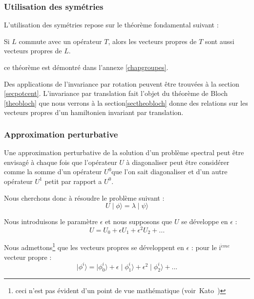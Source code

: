 \documentclass[12pt]{book}
\begin{document}
\subsubsection{Utilisation des sym\'etries}
L'utilisation des sym\'etries repose sur le th\'eor\`eme fondamental suivant :
\begin{thm}
Si $L$ commute avec un op\'erateur $T$, alors les vecteurs propres de $T$ sont
aussi vecteurs propres de $L$. 
\end{thm}
ce th\'eor\`eme est d\'emontr\'e dans l'annexe \ref{chapgroupes}.

Des applications de l'invariance par rotation peuvent \^etre trouv\'ees \`a la
section \ref{secpotcent}.
L'invariance par translation fait l'objet du th\'eor\`eme de Bloch
\ref{theobloch} que nous verrons \`a la 
section\ref{sectheobloch} donne des relations sur les vecteurs propres
d'un hamiltonien invariant par translation.

\subsubsection{Approximation perturbative}
Une approximation perturbative  de la solution d'un probl\`eme spectral peut
\^etre envisag\'e \`a chaque fois que l'op\'erateur $U$ \`a diagonaliser peut
\^etre consid\'erer comme la somme d'un op\'erateur $U^{0} $que l'on sait
diagonaliser 
et d'un autre op\'erateur $U^{1}$ petit par rapport a $U^{0}$.


Nous cherchons donc \`{a} r\'{e}soudre le probl\`{e}me  suivant
:
\begin{equation} 
U\mid  \phi \rangle  = \lambda\mid  \psi \rangle \label{bod}
\end{equation}

Nous introduisons le param\`etre $\epsilon$ et nous supposons que $U$
 se d\'{e}veloppe en $\epsilon$ :
\begin{equation} 
U=U_{0}+\epsilon U_{1}+\epsilon ^{2}U_2+...
\end{equation}

Nous admettons\footnote{ceci n'est pas \'evident d'un point de vue
math\'ematique (voir~{Kato}~\cite{ma:equad:Kato66})} que les vecteurs propres
se d\'eveloppent en $\epsilon$ :
pour le i$^{\grave eme}$ vecteur propre :
\begin{equation} 
\mid \phi^{i}\rangle =\mid \phi^{i}_{0}\rangle +\epsilon
\mid \phi^{i}_{1}\rangle +\epsilon^{2}\mid \phi^{i}_{2}\rangle +...
\label{hyph} 
\end{equation}
\end{document}
